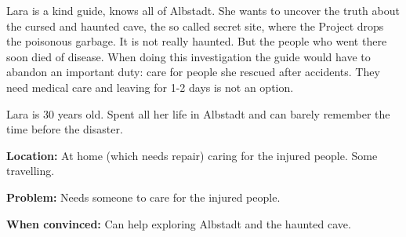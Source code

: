 \begin{npcBox}[title=Lara]
    \begin{consequences}
    \item {}
    \item {}
    \item {}
    \end{consequences}

    \begin{npcDescription}
    Lara is a kind guide, knows all of Albstadt. She wants to uncover the truth about the cursed and haunted cave, the so called secret site, where the Project drops the poisonous garbage. It is not really haunted. But the people who went there soon died of disease.
    When doing this investigation the guide would have to abandon an important duty: care for people she rescued after accidents. They need medical care and leaving for 1-2 days is not an option.

    Lara is 30 years old. Spent all her life in Albstadt and can barely remember the time before the disaster.

    \textbf{Location:} At home (which needs repair) caring for the injured people. Some travelling.

    \textbf{Problem:} Needs someone to care for the injured people.

    \textbf{When convinced:} Can help exploring Albstadt and the haunted cave.
    \end{npcDescription}

\end{npcBox}

\newpage

